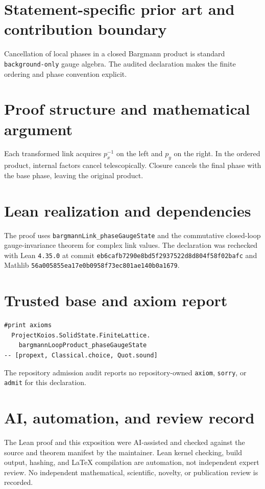 \documentclass[11pt]{article}
\begin{document}
\section{Statement-specific prior art and contribution boundary}
Cancellation of local phases in a closed Bargmann product is standard \texttt{background-only} gauge algebra.  The audited declaration makes the finite ordering and phase convention explicit.

\section{Proof structure and mathematical argument}
Each transformed link acquires $p_x^{-1}$ on the left and $p_y$ on the right.  In the ordered product, internal factors cancel telescopically.  Closure cancels the final phase with the base phase, leaving the original product.

\section{Lean realization and dependencies}
The proof uses \texttt{bargmannLink\_phaseGaugeState} and the commutative closed-loop gauge-invariance theorem for complex link values.  The declaration was rechecked with Lean \texttt{4.35.0} at commit \texttt{eb6cafb7290e8bd5f2937522d8d804f58f02bafc} and Mathlib \texttt{56a005855ea17e0b0958f73ec801ae140b0a1679}.

\section{Trusted base and axiom report}
\begin{verbatim}
#print axioms
  ProjectKoios.SolidState.FiniteLattice.
    bargmannLoopProduct_phaseGaugeState
-- [propext, Classical.choice, Quot.sound]
\end{verbatim}
The repository admission audit reports no repository-owned \texttt{axiom}, \texttt{sorry}, or
\texttt{admit} for this declaration.

\section{AI, automation, and review record}
The Lean proof and this exposition were AI-assisted and checked against the source and theorem
manifest by the maintainer.  Lean kernel checking, build output, hashing, and LaTeX compilation are
automation, not independent expert review.  No independent mathematical, scientific, novelty, or
publication review is recorded.
\end{document}
